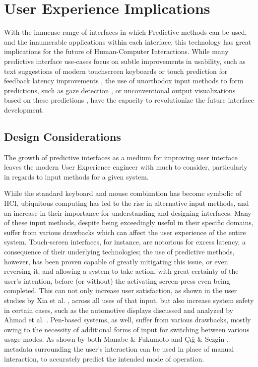 \documentclass[format=acmsmall, nonacm, authorversion, screen]{acmart}
\begin{document}
\section{User Experience Implications}%
With the immense range of interfaces in which Predictive methods can be used, and the innumerable applications within each interface, this technology has great implications for the future of Human-Computer Interactions. While many predictive interface use-cases focus on subtle improvements in usability, such as text suggestions of modern touchscreen keyboards \citep{quinn2016costbenefit} or touch prediction for feedback latency improvements \citep{xia2014zerolatency}, the use of unorthodox input methods to form predictions, such as gaze detection \citep{cig2014gaze}, or unconventional output visualizations based on these predictions \citep{ruotsalo2014intent}, have the capacity to revolutionize the future interface development.


\subsection{Design Considerations}%
The growth of predictive interfaces as a medium for improving user interface leaves the modern User Experience engineer with much to consider, particularly in regards to input methods for a given system. 

While the standard keyboard and mouse combination has become symbolic of HCI, ubiquitous computing has led to the rise in alternative input methods, and an increase in their importance for understanding and designing interfaces. Many of these input methods, despite being exceedingly useful in their specific domains, suffer from various drawbacks which can affect the user experience of the entire system. Touch-screen interfaces, for instance, are notorious for excess latency, a consequence of their underlying technologies; the use of predictive methods, however, has been proven capable of greatly mitigating this issue, or even reversing it, and allowing a system to take action, with great certainty of the user's intention, before (or without) the activating screen-press even being completed. This can not only increase user satisfaction, as shown in the user studies by Xia et al. \citep{xia2014zerolatency}, across all uses of that input, but also increase system safety in certain cases, such as the automotive displays discussed and analyzed by Ahmad et al. \citep{ahmad2018selection}. Pen-based systems, as well, suffer from various drawbacks, mostly owing to the necessity of additional forms of input for switching between various usage modes. As shown by both Manabe \& Fukumoto \citep{manabe2009recognition} and \c{C}\i\u{g} \& Sezgin \citep{cig2014gaze}, metadata surrounding the user's interaction can be used in place of manual interaction, to accurately predict the intended mode of operation. 
\end{document}
